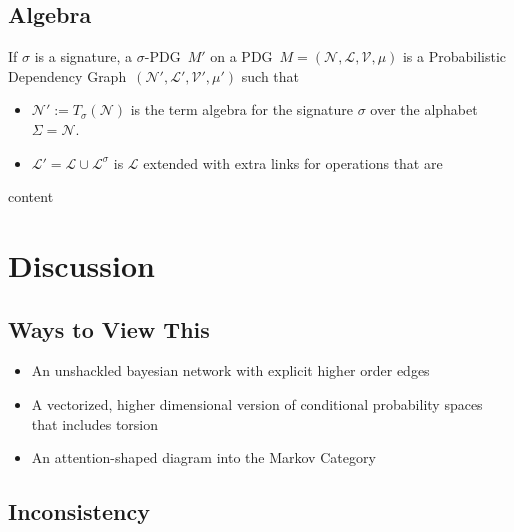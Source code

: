 \documentclass{article}
\newcommand\changeon{\color{note-fg} }
\newcommand\changeoff{\color{black} }
\newcommand{\modelname}{Probabilistic Dependency Graph}
\newcommand{\MN}{PDG}
\begin{document}
	\begin{vcat}
		\section{Algebra}\label{sec:algebra}
		\begin{defn}
			If $\sigma$ is a signature, a $\sigma$-\MN\ $M'$ on a \MN\ $M=(\mathcal N, \mathcal L, \mathcal V, \mu)$ is a \modelname\ $(\mathcal N', \mathcal L', \mathcal V', \mu')$ such that
			\begin{itemize}
				\item $\mathcal N':= T_\sigma(\mathcal N)$ is the term algebra for the signature $\sigma$ over the alphabet $\Sigma = \mathcal N$.
				\item $\mathcal L' = \mathcal L \cup \mathcal L^\sigma$ is $\mathcal L$ extended with extra links for operations that are 
			\end{itemize}
		\end{defn}
		
		\begin{example}
			content
		\end{example}
		
	\end{vcat}
	\section{Discussion}
	
	\changeon
	\subsection{Ways to View This}
	\begin{itemize}
		\item An unshackled bayesian network with explicit higher order edges
		\item A vectorized, higher dimensional version of conditional probability spaces that includes torsion
		\item An attention-shaped diagram into the Markov Category
	\end{itemize}	
	\changeoff

	\subsection{Inconsistency} \label{sec:consistency-ethos}
\end{document}
